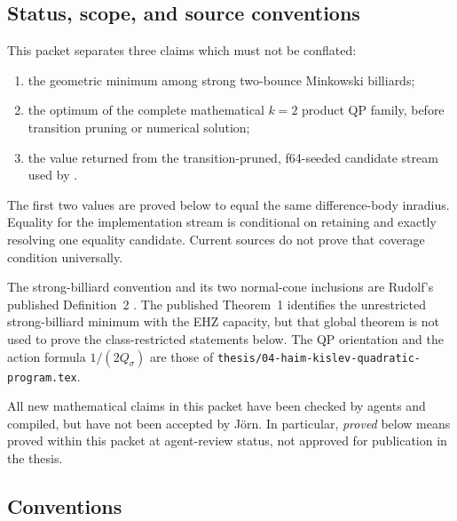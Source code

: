 %

\subsection{Status, scope, and source conventions}
\label{subsec:product-two-bounce-status}

This packet separates three claims which must not be conflated:
\begin{enumerate}
  \item the geometric minimum among strong two-bounce Minkowski billiards;
  \item the optimum of the complete mathematical \(k=2\) product QP family,
    before transition pruning or numerical solution;
  \item the value returned from the transition-pruned, f64-seeded candidate
    stream used by
    .
\end{enumerate}
The first two values are proved below to equal the same difference-body
inradius.  Equality for the implementation stream is conditional on retaining
and exactly resolving one equality candidate.  Current sources do not prove
that coverage condition universally.

The strong-billiard convention and its two normal-cone inclusions are
Rudolf's published Definition~2 \cite[Definition~2]{Rudolf2022}.  The
published Theorem~1 identifies the unrestricted strong-billiard minimum with
the EHZ capacity, but that global theorem is not used to prove the
class-restricted statements below.  The QP orientation and the action formula
\(1/(2Q_\sigma)\) are those of
\texttt{thesis/04-haim-kislev-quadratic-program.tex}.

\begin{unverified}
All new mathematical claims in this packet have been checked by agents and
compiled, but have not been accepted by Jörn.  In particular, \emph{proved}
below means proved within this packet at agent-review status, not approved for
publication in the thesis.
\end{unverified}

\subsection{Conventions}
\label{subsec:product-two-bounce-conventions}

